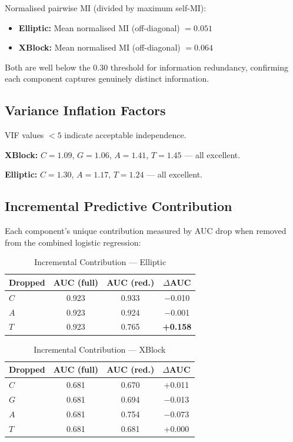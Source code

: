 \documentclass[journal]{IEEEtran}
\begin{document}
Normalised pairwise MI (divided by maximum self-MI):
\begin{itemize}
  \item \textbf{Elliptic:} Mean normalised MI (off-diagonal) $= 0.051$ \checkmark
  \item \textbf{XBlock:} Mean normalised MI (off-diagonal) $= 0.064$ \checkmark
\end{itemize}

Both are well below the 0.30 threshold for information redundancy, confirming each component captures genuinely distinct information.

\subsection{Variance Inflation Factors}

VIF values $<5$ indicate acceptable independence.

\textbf{XBlock:} $C = 1.09$, $G = 1.06$, $A = 1.41$, $T = 1.45$ --- all excellent.

\textbf{Elliptic:} $C = 1.30$, $A = 1.17$, $T = 1.24$ --- all excellent.

\subsection{Incremental Predictive Contribution}

Each component's unique contribution measured by AUC drop when removed from the combined logistic regression:

\begin{table}[!t]
\centering
\caption{Incremental Contribution --- Elliptic}
\label{tab:incr_elliptic}
\begin{tabular}{@{}lccc@{}}
\toprule
\textbf{Dropped} & \textbf{AUC (full)} & \textbf{AUC (red.)} & $\Delta$\textbf{AUC} \\
\midrule
$C$ & 0.923 & 0.933 & $-$0.010 \\
$A$ & 0.923 & 0.924 & $-$0.001 \\
$T$ & 0.923 & 0.765 & \textbf{+0.158} \\
\bottomrule
\end{tabular}
\end{table}

\begin{table}[!t]
\centering
\caption{Incremental Contribution --- XBlock}
\label{tab:incr_xblock}
\begin{tabular}{@{}lccc@{}}
\toprule
\textbf{Dropped} & \textbf{AUC (full)} & \textbf{AUC (red.)} & $\Delta$\textbf{AUC} \\
\midrule
$C$ & 0.681 & 0.670 & +0.011 \\
$G$ & 0.681 & 0.694 & $-$0.013 \\
$A$ & 0.681 & 0.754 & $\mathbf{-0.073}$ \\
$T$ & 0.681 & 0.681 & +0.000 \\
\bottomrule
\end{tabular}
\end{table}
\end{document}
